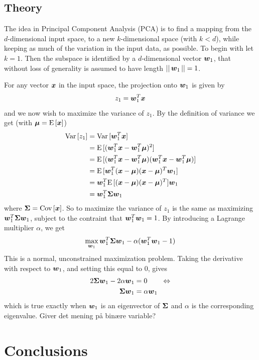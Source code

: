 \subsection{Theory}
The idea in Principal Component Analysis (PCA) is to find a mapping from the $d$-dimensional input space, to a new $k$-dimensional space (with $k<d$), while keeping as much of the variation in the input data, as possible. To begin with let $k=1$. Then the subspace is identified by a $d$-dimensional vector $\boldsymbol{w}_1$, that without loss of generality is assumed to have length $||\,\boldsymbol{w}_1\,||=1$. \par
For any vector $\boldsymbol{x}$ in the input space, the projection onto $\boldsymbol{w}_1$ is given by
\[
    z_1 = \boldsymbol{w}_1^T \boldsymbol{x}
\]
and we now wish to maximize the variance of $z_1$. By the definition of variance we get (with $\boldsymbol{\mu}=\text{E}\,[\boldsymbol{x}]$)
\begin{align*}
    \text{Var}\,[z_1] &= \text{Var}\,[\boldsymbol{w}_1^T\boldsymbol{x}] \\
    &= \text{E}\,[(\boldsymbol{w}_1^T\boldsymbol{x} - \boldsymbol{w}_1^T\boldsymbol{\mu})^2] \\
    &= \text{E}\,[(\boldsymbol{w}_1^T\boldsymbol{x} - \boldsymbol{w}_1^T\boldsymbol{\mu})(\boldsymbol{w}_1^T\boldsymbol{x} - \boldsymbol{w}_1^T\boldsymbol{\mu})] \\
    &= \text{E}\,[\boldsymbol{w}_1^T(\boldsymbol{x}-\boldsymbol{\mu})(\boldsymbol{x}-\boldsymbol{\mu})^T\boldsymbol{w}_1] \\
    &= \boldsymbol{w}_1^T\text{E}\,[(\boldsymbol{x}-\boldsymbol{\mu})(\boldsymbol{x}-\boldsymbol{\mu})^T]\boldsymbol{w}_1 \\
    &= \boldsymbol{w}_1^T\boldsymbol{\Sigma}\boldsymbol{w}_1
\end{align*}
where $\boldsymbol{\Sigma} = \text{Cov}\,[\boldsymbol{x}]$. So to maximize the variance of $z_1$ is the same as maximizing $\boldsymbol{w}_1^T\boldsymbol{\Sigma}\boldsymbol{w}_1$, subject to the contraint that $\boldsymbol{w}_1^T\boldsymbol{w}_1=1$. By introducing a Lagrange multiplier $\alpha$, we get
\[
    \max_{\boldsymbol{w}_1} \boldsymbol{w}_1^T\boldsymbol{\Sigma}\boldsymbol{w}_1 - \alpha(\boldsymbol{w}_1^T\boldsymbol{w}_1 - 1)
\]
This is a normal, unconstrained maximization problem. Taking the derivative with respect to $\boldsymbol{w}_1$, and setting this equal to 0, gives
\begin{align*}
    2\boldsymbol{\Sigma}\boldsymbol{w}_1 - 2\alpha\boldsymbol{w}_1 &= 0 \quad\quad\Leftrightarrow \\
    \boldsymbol{\Sigma}\boldsymbol{w}_1 &= \alpha\boldsymbol{w}_1
\end{align*}
which is true exactly when $\boldsymbol{w}_1$ is an eigenvector of $\boldsymbol{\Sigma}$ and $\alpha$ is the corresponding eigenvalue.
Giver det mening på binære variable?

\section{Conclusions}
